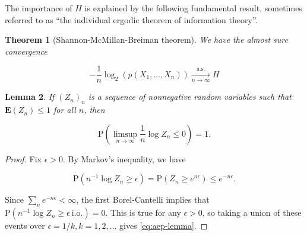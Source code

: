 \documentclass[11pt]{report}
\theoremstyle{plain}
\newtheorem{thm}{Theorem}[chapter]
\newtheorem{lem}[thm]{Lemma}
\theoremstyle{definition}
\begin{document}
The importance of $H$ is explained by the following
fundamental result, sometimes referred to as ``the
individual ergodic theorem of information theory''.

\begin{thm}[Shannon-McMillan-Breiman theorem]
\label{thm-shannon-mcmillan-breiman}
We have the almost sure convergence

\begin{equation*} \tag{33}\label{eq:shannon-mcmillan-breiman}
-\frac{1}{n}\log_2(p(X_1,\ldots,X_n)) \xrightarrow[n\to\infty]{\textrm{a.s.}} H
\end{equation*}

\end{thm}

\begin{lem}
\label{lem-aep-lemma}
If $(Z_n)_n$ is a sequence of nonnegative random
variables such that $\mathbf{E}(Z_n)\le 1$ for all
$n$, then

\begin{equation*} \tag{34}\label{eq:aep-lemma}
\mathrm{P}\left(\limsup_{n\to\infty} \frac{1}{n} \log Z_n \le 0\right) = 1.
\end{equation*}

\end{lem}

\begin{proof}
Fix $\epsilon>0$. By Markov's inequality, we have

\[
\mathrm{P}(n^{-1} \log Z_n \ge \epsilon) = \mathrm{P}(Z_n \ge e^{n\epsilon}) \le e^{-n\epsilon}.
\]

\noindent Since $\sum_n e^{-n\epsilon}<\infty$, the first
Borel-Cantelli implies that
$\mathrm{P}(n^{-1} \log Z_n \ge \epsilon \
\textrm{i.o.}) = 0$.
This is true for any $\epsilon>0$, so taking a union
of these events over $\epsilon=1/k, k=1,2,\ldots$
gives \eqref{eq:aep-lemma}.
\end{proof}
\end{document}
